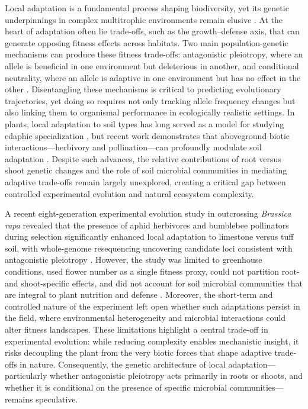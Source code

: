 \documentclass{article}
\begin{document}
Local adaptation is a fundamental process shaping biodiversity, yet its genetic underpinnings in complex multitrophic environments remain elusive \cite{savolainen2013ecological, kawecki2004conceptual}. At the heart of adaptation often lie trade-offs, such as the growth–defense axis, that can generate opposing fitness effects across habitats. Two main population-genetic mechanisms can produce these fitness trade-offs: antagonistic pleiotropy, where an allele is beneficial in one environment but deleterious in another, and conditional neutrality, where an allele is adaptive in one environment but has no effect in the other \cite{anderson2011evolutionary, colautti2017invasion}. Disentangling these mechanisms is critical to predicting evolutionary trajectories, yet doing so requires not only tracking allele frequency changes but also linking them to organismal performance in ecologically realistic settings. In plants, local adaptation to soil types has long served as a model for studying edaphic specialization \cite{wright2013evolutionary}, but recent work demonstrates that aboveground biotic interactions—herbivory and pollination—can profoundly modulate soil adaptation \cite{smith2023biotic}. Despite such advances, the relative contributions of root versus shoot genetic changes and the role of soil microbial communities in mediating adaptive trade-offs remain largely unexplored, creating a critical gap between controlled experimental evolution and natural ecosystem complexity.

A recent eight-generation experimental evolution study in outcrossing \textit{Brassica rapa} revealed that the presence of aphid herbivores and bumblebee pollinators during selection significantly enhanced local adaptation to limestone versus tuff soil, with whole-genome resequencing uncovering candidate loci consistent with antagonistic pleiotropy \cite{smith2023biotic}. However, the study was limited to greenhouse conditions, used flower number as a single fitness proxy, could not partition root- and shoot-specific effects, and did not account for soil microbial communities that are integral to plant nutrition and defense \cite{trivedi2020plant}. Moreover, the short-term and controlled nature of the experiment left open whether such adaptations persist in the field, where environmental heterogeneity and microbial interactions could alter fitness landscapes. These limitations highlight a central trade-off in experimental evolution: while reducing complexity enables mechanistic insight, it risks decoupling the plant from the very biotic forces that shape adaptive trade-offs in nature. Consequently, the genetic architecture of local adaptation—particularly whether antagonistic pleiotropy acts primarily in roots or shoots, and whether it is conditional on the presence of specific microbial communities—remains speculative.
\end{document}
